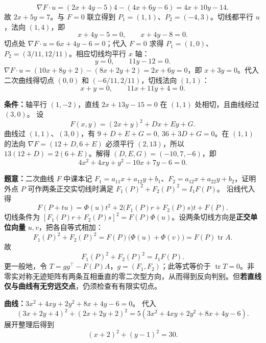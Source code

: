 \[
\nabla F\cdot u=(2x+4y-5)4-(4x+6y-6)=4x+10y-14.
\]
故 $2x+5y=7$。与 $F=0$ 联立得到 $P_1=(1,1)$、$P_2=(-4,3)$。切线都平行 $u$，法向 $(1,4)$，即
\[\boxed{x+4y-5=0,\qquad x+4y-8=0.}\]
切点处 $\nabla F\cdot u=6x+4y-6=0$；代入 $F=0$ 求得 $P_1=(1,0)$、$P_2=(3/11,12/11)$。相应切线均平行 $x$ 轴：
\[\boxed{y=0,\qquad 11y-12=0.}\]
$\nabla F\cdot u=(10x+8y+2)-(8x+2y+2)=2x+6y=0$，即 $x+3y=0$。代入二次曲线得切点 $(0,0)$ 和 $(-6/11,2/11)$，切线法向 $(1,1)$：
\[\boxed{x+y=0,\qquad 11x+11y+4=0.}\]

\textbf{条件：}轴平行 $(1,-2)$，直线 $2x+13y-15=0$ 在 $(1,1)$ 处相切，且曲线经过 $(3,0)$。
设
\[F(x,y)=(2x+y)^2+Dx+Ey+G.
\]
曲线过 $(1,1)$、$(3,0)$，有 $9+D+E+G=0,\ 36+3D+G=0$。在 $(1,1)$ 的法向 $\nabla F=(12+D,6+E)$ 必须平行 $(2,13)$，所以 $13(12+D)=2(6+E)$。解得 $(D,E,G)=(-10,7,-6)$，即
\[\boxed{4x^2+4xy+y^2-10x+7y-6=0.}\]

\textbf{题意：}二次曲线 $F$ 中课本记 $F_1=a_{11}x+a_{12}y+b_1$、$F_2=a_{12}x+a_{22}y+b_2$，证明外点 $P$ 可作两条正交实切线时满足 $F_1(P)^2+F_2(P)^2=I_1F(P)$。
沿线代入得
\[F(P+tu)=\Phi(u)t^2+2\bigl(F_1(P)r+F_2(P)s\bigr)t+F(P).
\]
切线条件为 $[F_1(P)r+F_2(P)s]^2=F(P)\Phi(u)$。设两条切线方向是\textbf{正交单位向量} $u,v$，把各自等式相加：
\[
F_1(P)^2+F_2(P)^2=F(P)\bigl(\Phi(u)+\Phi(v)\bigr)=F(P)\operatorname{tr}A.
\]
故
\[\boxed{F_1(P)^2+F_2(P)^2=I_1F(P).}\]
更一般地，令 $T=gg^\top-F(P)A$，$g=(F_1,F_2)$；此等式等价于 $\operatorname{tr}T=0$。非零实对称无迹矩阵有两条互相垂直的零二次型方向，从而得到反向判别。但\textbf{若直线仅与曲线有无穷远交点}，仍须检查有有限实切点。

\textbf{曲线：}$3x^2+4xy+2y^2+8x+4y-6=0$。
代入
\[
(3x+2y+4)^2+(2x+2y+2)^2
=5(3x^2+4xy+2y^2+8x+4y-6).
\]
展开整理后得到
\[\boxed{(x+2)^2+(y-1)^2=30.}\]


